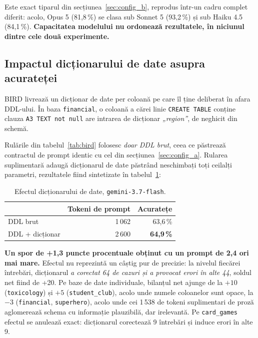 \documentclass[12pt,a4paper]{report}
\newcommand{\hd}[1]{\textbf{#1}}
\newcommand{\code}[1]{\texttt{\small #1}}
\begin{document}
Este exact tiparul din secțiunea~\ref{sec:config_b}, reprodus într-un cadru complet diferit: acolo,
Opus 5 (81,8\,\%) se clasa sub Sonnet 5 (93,2\,\%) și sub Haiku 4.5
(84,1\,\%). \textbf{Capacitatea modelului nu ordonează rezultatele, în niciunul
dintre cele două experimente.}

\subsection{Impactul dicționarului de date asupra acurateței}

BIRD livrează un dicționar de date per coloană pe care îl ține deliberat în
afara DDL-ului. În baza \code{financial}, o coloană a cărei linie
\code{CREATE TABLE} conține clauza \code{A3 TEXT not null} are intrarea de dicționar
\emph{„region”}, de neghicit din schemă.

Rulările din tabelul~\ref{tab:bird} folosesc \emph{doar DDL brut}, ceea ce
păstrează contractul de prompt identic cu cel din secțiunea~\ref{sec:config_a}. Rularea suplimentară
adaugă dicționarul de date păstrând neschimbați toți ceilalți parametri, rezultatele fiind sintetizate în tabelul~\ref{tab:dict}:

\begin{table}[H]
\centering
\caption{Efectul dicționarului de date, \code{gemini-3.7-flash}.}
\label{tab:dict}
\footnotesize
\begin{tabular}{@{}lrr@{}}
\toprule
& \hd{Tokeni de prompt} & \hd{Acuratețe} \\
\midrule
DDL brut & 1\,062 & 63,6\,\% \\
DDL + dicționar & 2\,600 & \textbf{64,9\,\%} \\
\bottomrule
\end{tabular}
\end{table}

\textbf{Un spor de +1,3 puncte procentuale obținut cu un prompt de 2,4 ori mai mare.} Efectul nu reprezintă
un câștig pur de precizie: la nivelul fiecărei întrebări, dicționarul
\emph{a corectat 64 de cazuri și a provocat erori în alte 44}, soldul net fiind de +20. Pe baze de date individuale, bilanțul net
ajunge de la $+10$ (\code{toxicology}) și $+5$ (\code{student\_club}), acolo
unde numele coloanelor sunt opace, la $-3$ (\code{financial},
\code{superhero}), acolo unde cei 1\,538 de tokeni suplimentari de proză
aglomerează schema cu informație plauzibilă, dar irelevantă. Pe
\code{card\_games} efectul se anulează exact: dicționarul corectează 9 întrebări
și induce erori în alte 9.
\end{document}
